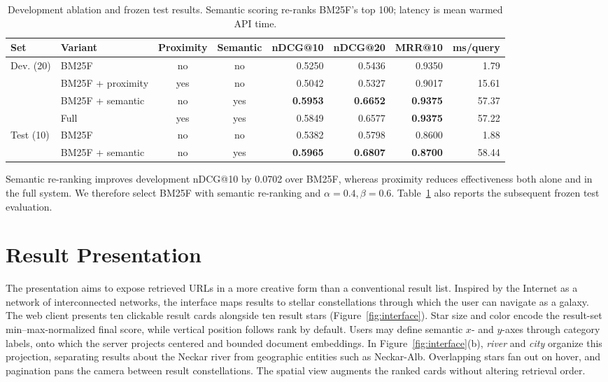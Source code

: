 \documentclass{article}
\begin{document}
\begin{table}[t]
\centering
\caption{Development ablation and frozen test results. Semantic scoring
re-ranks BM25F's top 100; latency is mean warmed API time.}
\label{tab:retrieval-evaluation}
\small
\setlength{\tabcolsep}{6pt}
\begin{tabular}{@{}llccrrrr@{}}
\toprule
Set & Variant & Proximity & Semantic & nDCG@10 & nDCG@20 & MRR@10 & ms/query \\
\midrule
Dev. (20) & BM25F    & no  & no  & 0.5250 & 0.5436 & 0.9350 &  1.79 \\
 & BM25F + proximity & yes & no  & 0.5042 & 0.5327 & 0.9017 & 15.61 \\
 & BM25F + semantic  & no  & yes & \textbf{0.5953} & \textbf{0.6652} &
  \textbf{0.9375} & 57.37 \\
 & Full              & yes & yes & 0.5849 & 0.6577 & \textbf{0.9375} & 57.22 \\
\midrule
Test (10) & BM25F    & no  & no  & 0.5382 & 0.5798 & 0.8600 & 1.88 \\
 & BM25F + semantic  & no  & yes & \textbf{0.5965} & \textbf{0.6807} &
  \textbf{0.8700} & 58.44 \\
\bottomrule
\end{tabular}
\end{table}

Semantic re-ranking improves development nDCG@10 by 0.0702 over BM25F, whereas proximity
reduces effectiveness both alone and in the full system. We therefore select
BM25F with semantic re-ranking and $\alpha=0.4,\beta=0.6$.
Table~\ref{tab:retrieval-evaluation} also reports the subsequent frozen test
evaluation.

\section{Result Presentation}
The presentation aims to expose retrieved URLs in a more creative form than a
conventional result list. Inspired by the Internet as a network of
interconnected networks, the interface maps results to stellar constellations
through which the user can navigate as a galaxy. The web client presents ten
clickable result cards alongside ten result stars
(Figure~\ref{fig:interface}). Star size and color encode the result-set
min--max-normalized final score, while vertical position follows rank by
default. Users may define semantic \(x\)- and \(y\)-axes through category
labels, onto which the server projects centered and bounded document
embeddings. In Figure~\ref{fig:interface}(b), \emph{river} and \emph{city}
organize this projection, separating results about the Neckar river from
geographic entities such as Neckar-Alb. Overlapping stars fan out on hover,
and pagination pans the camera between result constellations. The spatial view
augments the ranked cards without altering retrieval order.
\end{document}

